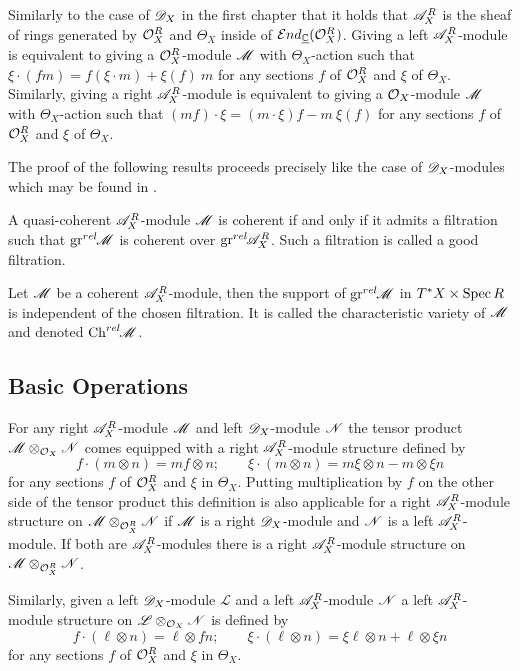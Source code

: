Similarly to the case of $\mathscr{D}_X$ in the first chapter that  it holds that $\mathscr{A}_X^R$ is the sheaf of rings generated by $\mathcal{O}_X^R$ and $\Theta_X$ inside of $\mathcal{E}nd_{\underline{\mathbb{C}}}(\mathcal{O}_X^R)$. Giving a left $\mathscr{A}_X^R$-module is equivalent to giving a $\mathcal{O}_X^R$-module $\mathscr{M}$ with $\Theta_X$-action such that
$\xi\cdot (fm) = f (\xi \cdot m)  + \xi(f)\ m  $
for any sections $f$ of $\mathcal{O}_X^R$ and $\xi$ of $\Theta_X$. Similarly, giving a right $\mathscr{A}_X^R$-module is equivalent to giving a $\mathcal{O}_X$-module $\mathscr{M}$ with $\Theta_X$-action such that $(mf)\cdot\xi = (m\cdot\xi)f - m\ \xi(f) $ for any sections $f$ of $\mathcal{O}_X^R$ and $\xi$ of $\Theta_X$.

The proof of the following results proceeds precisely like the case of $\mathscr{D}_X$-modules which may be found in \cite[Chapter 2]{hotta2007d}. 
\begin{proposition}\label{prop: CoherentAndGoodFiltration}
    A quasi-coherent $\mathscr{A}_X^R$-module $\mathscr{M}$ is coherent if and only if it admits a filtration such that $\operatorname{gr}^{rel}\mkern-5mu \mathscr{M}$ is coherent over $\operatorname{gr}^{rel}\mkern-5mu \mathscr{A}_X^R$. Such a filtration is called a good filtration.
\end{proposition}
\begin{proposition}
    Let $\mathscr{M}$ be a coherent $\mathscr{A}_X^R$-module, then the support of $\operatorname{gr}^{rel}\mkern-5mu \mathscr{M}$ in $T^*X \times \operatorname{Spec} R$ is independent of the chosen filtration. It is called the characteristic variety of $\mathscr{M}$ and denoted $\operatorname{Ch}^{rel}\mkern-5mu \mathscr{M}$.
\end{proposition}
\subsection{Basic Operations}\label{sec: BasicOperations}
For any right $\mathscr{A}_{X}^R$-module $\mathscr{M}$ and left $\mathscr{D}_X$-module $\mathscr{N}$ the tensor product $\mathscr{M} \otimes_{\mathcal{O}_X} \mathscr{N}$ comes equipped with a right $\mathscr{A}_X^R$-module structure defined by
$$f\cdot (m\otimes n) = mf \otimes n; \qquad \xi \cdot (m\otimes n) = m\xi \otimes n - m\otimes \xi n $$
for any sections $f$ of $\mathcal{O}_X^R$ and $\xi$ in $\Theta_X$. Putting multiplication by $f$ on the other side of the tensor product this definition is also applicable for a right $\mathscr{A}_X^R$-module structure on $\mathscr{M}\otimes_{\mathcal{O}_X^R} \mathscr{N}$ if $\mathscr{M}$ is a right $\mathscr{D}_X$-module and $\mathscr{N}$ is a left $\mathscr{A}_X^R$-module. If both are $\mathscr{A}_X^R$-modules there is a right $\mathscr{A}_X^R$-module structure on $\mathscr{M}\otimes_{\mathcal{O}_X^R} \mathscr{N}$.

Similarly, given a left $\mathscr{D}_X$-module $\mathscr{L}$ and a left $\mathscr{A}_X^R$-module $\mathscr{N}$ a left $\mathscr{A}_X^R$-module structure on $\mathscr{L} \otimes_{\mathcal{O}_X} \mathscr{N}$ is defined by
$$f \cdot (\ell\otimes n) =\ell \otimes fn; \qquad \xi \cdot (\ell\otimes n ) = \xi \ell \otimes n + \ell \otimes \xi n$$
for any sections $f$ of $\mathcal{O}_X^R$ and $\xi$ in $\Theta_X$.

